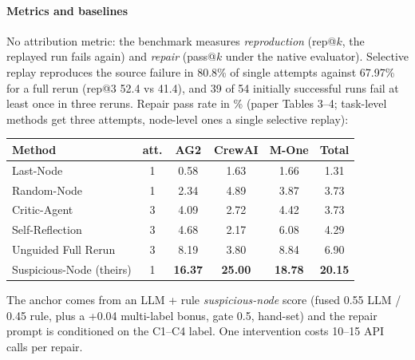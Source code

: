 \paragraph{Metrics and baselines} No attribution metric: the benchmark measures \emph{reproduction} (rep@$k$, the replayed run fails again) and \emph{repair} (pass@$k$ under the native evaluator). Selective replay reproduces the source failure in 80.8\% of single attempts against 67.97\% for a full rerun (rep@3 52.4 vs 41.4), and 39 of 54 initially successful runs fail at least once in three reruns. Repair pass rate in \% (paper Tables 3--4; task-level methods get three attempts, node-level ones a single selective replay):

\begin{center}\small\setlength{\tabcolsep}{3.5pt}
\begin{tabular}{@{}lccccc@{}}\toprule
Method & att. & AG2 & CrewAI & M-One & Total\\\midrule
Last-Node & 1 & 0.58 & 1.63 & 1.66 & 1.31\\
Random-Node & 1 & 2.34 & 4.89 & 3.87 & 3.73\\
Critic-Agent & 3 & 4.09 & 2.72 & 4.42 & 3.73\\
Self-Reflection & 3 & 4.68 & 2.17 & 6.08 & 4.29\\
Unguided Full Rerun & 3 & 8.19 & 3.80 & 8.84 & 6.90\\
Suspicious-Node (theirs) & 1 & \textbf{16.37} & \textbf{25.00} & \textbf{18.78} & \textbf{20.15}\\\bottomrule
\end{tabular}
\end{center}
The anchor comes from an LLM + rule \emph{suspicious-node} score (fused 0.55 LLM / 0.45 rule, plus a +0.04 multi-label bonus, gate 0.5, hand-set) and the repair prompt is conditioned on the C1--C4 label. One intervention costs 10--15 API calls per repair.

